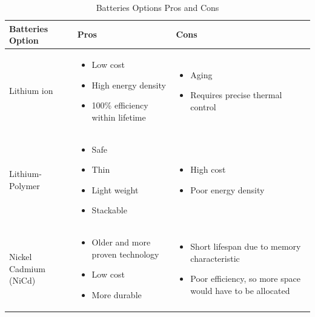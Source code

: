 \begin{table}[H]
\centering
\begin{tabular}{|p{}|p{}|p{}|} 
\hline
\textbf{Batteries Option} & \textbf{Pros} & \textbf{Cons}
\\
\hline
     Lithium ion
     &
    \begin{itemize}
        \item Low cost
        \item High energy density
        \item 100\% efficiency within lifetime
    \end{itemize}
    &
    \begin{itemize}
        \item Aging
        \item Requires precise thermal control
    \end{itemize}
    \\
\hline
     Lithium-Polymer
     &
    \begin{itemize}
        \item Safe
        \item Thin
        \item Light weight
        \item Stackable
    \end{itemize}
    &
    \begin{itemize}
        \item High cost
        \item Poor energy density
    \end{itemize}
    \\
\hline
    Nickel Cadmium (NiCd)
    &
    \begin{itemize}
        \item Older and more proven technology
        \item Low cost
        \item More durable
    \end{itemize}
    &
    \begin{itemize}
        \item Short lifespan due to memory characteristic
        \item Poor efficiency, so more space would have to be allocated
    \end{itemize}
    \\
\hline
\end{tabular}
\caption{Batteries Options Pros and Cons}
\label{tbl:Batteries_ProCon}
\end{table}